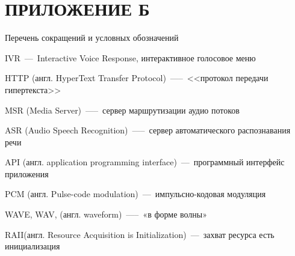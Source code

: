\chapter{ПРИЛОЖЕНИЕ Б}
\begin{center}
    Перечень сокращений и условных обозначений
\end{center}

\hypertarget{ivr}{IVR~---~Interactive Voice Response, интерактивное голосовое меню}

\hypertarget{http}{HTTP (англ. HyperText Transfer Protocol)~—--~<<протокол передачи гипертекста>>}

\hypertarget{msr}{MSR (Media Server)~—--~сервер маршрутизации аудио потоков}

\hypertarget{asr}{ASR (Audio Speech Recognition)~—--~сервер автоматического распознавания речи}

\hypertarget{api}{API (англ. application programming interface)~---~программный интерфейс приложения}

\hypertarget{pcm}{PCM (англ. Pulse-code modulation)~---~импульсно-кодовая модуляция}

\hypertarget{wav}{WAVE, WAV, (англ. waveform)~—--~«в форме волны»}

\hypertarget{raii}{RAII(англ. Resource Acquisition is Initialization)~---~захват ресурса есть инициализация}

\clearpage
